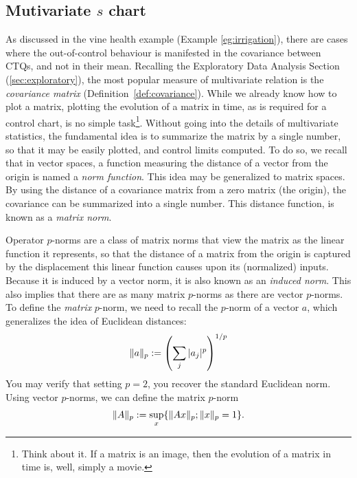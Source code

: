 \subsection[Mutivariate s chart]{Mutivariate $s$ chart}
\label{sec:multivarite_s}

As discussed in the vine health example (Example \ref{eg:irrigation}), there are cases where the out-of-control behaviour is manifested in the covariance between CTQs, and not in their mean.
Recalling the Exploratory Data Analysis Section (\ref{sec:exploratory}), the most popular measure of multivariate relation is the \emph{covariance matrix} (Definition~\ref{def:covariance}).
While we already know how to plot a matrix, plotting the evolution of a matrix in time, as is required for a control chart, is no simple task\footnote{Think about it. If a matrix is an image, then the evolution of a matrix in time is, well, simply a movie.}. 
Without going into the details of multivariate statistics, the fundamental idea is to summarize the matrix by a single number, so that it may be easily plotted, and control limits computed. 
To do so, we recall that in vector spaces, a function measuring the distance of a vector from the origin is named a \emph{norm function}.
This idea may be generalized to matrix spaces. 
By using the distance of a covariance matrix from a zero matrix (the origin), the covariance can be summarized into a single number. This distance function, is known as a \emph{matrix norm}.

\begin{definition}
Operator $p$-norms are a class of matrix norms that view the matrix as the linear function it represents, so that the distance of a matrix from the origin is captured by the displacement this linear function causes upon its (normalized) inputs.
Because it is induced by a vector norm, it is also known as an \emph{induced norm}.
This also implies that there are as many matrix $p$-norms as there are vector $p$-norms. 
To define the \emph{matrix} $p$-norm, we need to recall the $p$-norm of a vector $a$, which generalizes the idea of Euclidean distances:
\begin{align}
	\Vert a \Vert_p:= \left( \sum_j |a_j|^p \right)^{1/p}
\end{align}
You may verify that setting $p=2$, you recover the standard Euclidean norm.
Using vector $p$-norms, we can define the matrix $p$-norm 
\begin{align}
	\Vert A \Vert_p:= \sup_x \{ \Vert Ax \Vert_p; \Vert x \Vert_p=1 \}.
\end{align}
\end{definition}


